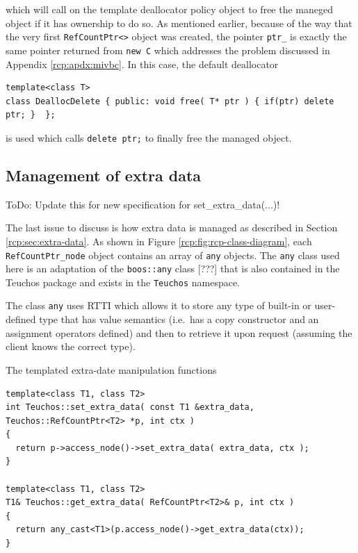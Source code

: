 {}\noindent{}which will call on the template deallocator policy object
to free the maneged object if it has ownership to do so.  As
mentioned earlier, because of the way that the very first
{}\texttt{RefCountPtr<>} object was created, the pointer
{}\texttt{ptr\_} is exactly the same pointer returned from
{}\texttt{new C} which addresses the problem discussed in Appendix
{}\ref{rcp:apdx:mivbc}.  In this case, the default deallocator

{\scriptsize\begin{verbatim}
template<class T>
class DeallocDelete { public: void free( T* ptr ) { if(ptr) delete ptr; }  };
\end{verbatim}}

{}\noindent{}is used which calls {}\texttt{delete ptr;} to finally
free the managed object.

%
\subsection{Management of extra data}
%

ToDo: Update this for new specification for set\_extra\_data(...)!

The last issue to discuss is how extra data is managed as described in
Section {}\ref{rcp:sec:extra-data}.  As shown in Figure
{}\ref{rcp:fig:rcp-class-diagram}, each
{}\texttt{Ref\-Count\-Ptr\-\_node} object contains an array of
{}\texttt{any} objects.  The {}\texttt{any} class used here is an
adaptation of the {}\texttt{boos\-::any} class [???] that is also
contained in the Teuchos package and exists in the {}\texttt{Teuchos}
namespace.

The class {}\texttt{any} uses RTTI which allows it to store any type
of built-in or user-defined type that has value semantics (i.e.~has a
copy constructor and an assignment operators defined) and then to
retrieve it upon request (assuming the client knows the correct type).

The templated extra-date manipulation functions

{\scriptsize\begin{verbatim}
template<class T1, class T2>
int Teuchos::set_extra_data( const T1 &extra_data, Teuchos::RefCountPtr<T2> *p, int ctx )
{
  return p->access_node()->set_extra_data( extra_data, ctx );
}

template<class T1, class T2>
T1& Teuchos::get_extra_data( RefCountPtr<T2>& p, int ctx )
{
  return any_cast<T1>(p.access_node()->get_extra_data(ctx));
}
\end{verbatim}}

